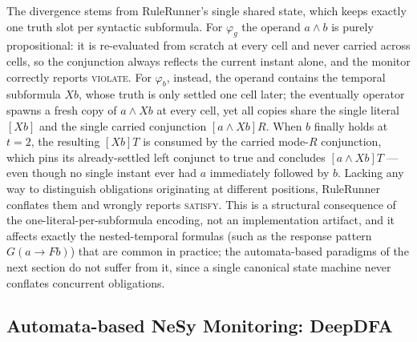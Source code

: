 \noindent
The divergence stems from RuleRunner's single shared state, which keeps exactly one truth slot per syntactic subformula. For $\varphi_g$ the operand $a \land b$ is purely propositional: it is re-evaluated from scratch at every cell and never carried across cells, so the conjunction always reflects the current instant alone, and the monitor correctly reports \textsc{violate}. For $\varphi_b$, instead, the operand contains the temporal subformula $Xb$, whose truth is only settled one cell later; the eventually operator spawns a fresh copy of $a \land Xb$ at every cell, yet all copies share the single literal $[Xb]$ and the single carried conjunction $[a \land Xb]R$. When $b$ finally holds at $t = 2$, the resulting $[Xb]T$ is consumed by the carried mode-$R$ conjunction, which pins its already-settled left conjunct to true and concludes $[a \land Xb]T$ --- even though no single instant ever had $a$ immediately followed by $b$. Lacking any way to distinguish obligations originating at different positions, RuleRunner conflates them and wrongly reports \textsc{satisfy}. This is a structural consequence of the one-literal-per-subformula encoding, not an implementation artifact, and it affects exactly the nested-temporal formulas (such as the response pattern $G(a \rightarrow Fb)$) that are common in practice; the automata-based paradigms of the next section do not suffer from it, since a single canonical state machine never conflates concurrent obligations.



\subsection{Automata-based NeSy Monitoring: DeepDFA}

